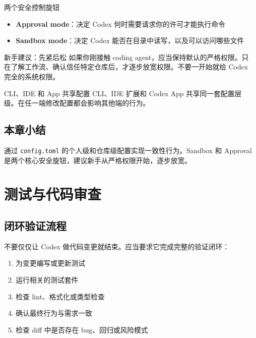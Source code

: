 \documentclass[a4paper]{article}
\begin{document}
\begin{importantbox}{两个安全控制旋钮}
\begin{itemize}[nosep]
    \item \textbf{Approval mode}：决定 Codex 何时需要请求你的许可才能执行命令
    \item \textbf{Sandbox mode}：决定 Codex 能否在目录中读写，以及可以访问哪些文件
\end{itemize}
\end{importantbox}

\begin{warningbox}{新手建议：先紧后松}
如果你刚接触 coding agent，应当保持默认的严格权限。只在了解工作流、确认信任特定仓库后，才逐步放宽权限。不要一开始就给 Codex 完全的系统权限。
\end{warningbox}

\begin{knowledgebox}{CLI、IDE 和 App 共享配置}
CLI、IDE 扩展和 Codex App 共享同一套配置层级。在任一端修改配置都会影响其他端的行为。
\end{knowledgebox}

\subsection{本章小结}

通过 \texttt{config.toml} 的个人级和仓库级配置实现一致性行为。Sandbox 和 Approval 是两个核心安全旋钮，建议新手从严格权限开始，逐步放宽。

\section{测试与代码审查}

\subsection{闭环验证流程}

不要仅仅让 Codex 做代码变更就结束。应当要求它完成完整的验证闭环：

\begin{enumerate}[nosep]
    \item 为变更编写或更新测试
    \item 运行相关的测试套件
    \item 检查 lint、格式化或类型检查
    \item 确认最终行为与需求一致
    \item 检查 diff 中是否存在 bug、回归或风险模式
\end{enumerate}
\end{document}
